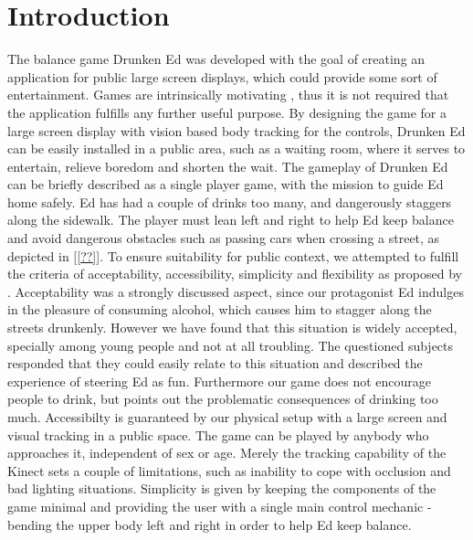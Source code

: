 \documentclass{chi-ext}
\begin{document}
\section{Introduction}
The balance game Drunken Ed was developed with the goal of creating an application for public large screen displays, which could provide some sort of entertainment. Games are intrinsically motivating \cite{salen2004rules} \cite{malone1981motivation}, thus it is not required that the application fulfills any further useful purpose. By designing the game for a large screen display with vision based body tracking for the controls, Drunken Ed can be easily installed in a public area, such as a waiting room, where it serves to entertain, relieve boredom and shorten the wait.
The gameplay of Drunken Ed can be briefly described as a single player game, with the mission to guide Ed home safely. Ed has had a couple of drinks too many, and dangerously staggers along the sidewalk. The player must lean left and right to help Ed keep balance and avoid dangerous obstacles such as passing cars when crossing a street, as depicted in [\ref{??}].
To ensure suitability for public context, we attempted to fulfill the criteria of acceptability, accessibility, simplicity and flexibility as proposed by \cite{kultima2009casual}. Acceptability was a strongly discussed aspect, since our protagonist Ed indulges in the pleasure of consuming alcohol, which causes him to stagger along the streets drunkenly. However we have found that this situation is widely accepted, specially among young people and not at all troubling. The questioned subjects responded that they could easily relate to this situation and described the experience of steering Ed as fun. Furthermore our game does not encourage people to drink, but points out the problematic consequences of drinking too much. Accessibilty is guaranteed by our physical setup with a large screen and visual tracking in a public space. The game can be played by anybody who approaches it, independent of sex or age. Merely the tracking capability of the Kinect sets a couple of limitations, such as inability to cope with occlusion and bad lighting situations. Simplicity is given by keeping the components of the game minimal and providing the user with a single main control mechanic - bending the upper body left and right in order to help Ed keep balance.
\end{document}
